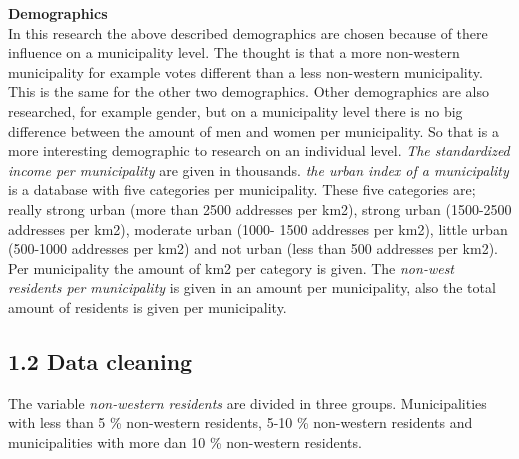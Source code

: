 \documentclass[11pt,]{article}
\begin{document}
\textbf{Demographics}\\
In this research the above described demographics are chosen because of
there influence on a municipality level. The thought is that a more
non-western municipality for example votes different than a less
non-western municipality. This is the same for the other two
demographics. Other demographics are also researched, for example
gender, but on a municipality level there is no big difference between
the amount of men and women per municipality. So that is a more
interesting demographic to research on an individual level. \emph{The
standardized income per municipality} are given in thousands. \emph{the
urban index of a municipality} is a database with five categories per
municipality. These five categories are; really strong urban (more than
2500 addresses per km2), strong urban (1500-2500 addresses per km2),
moderate urban (1000- 1500 addresses per km2), little urban (500-1000
addresses per km2) and not urban (less than 500 addresses per km2). Per
municipality the amount of km2 per category is given. The \emph{non-west
residents per municipality} is given in an amount per municipality, also
the total amount of residents is given per municipality.

\subsection{1.2 Data cleaning}\label{data-cleaning}

The variable \emph{non-western residents} are divided in three groups.
Municipalities with less than 5 \% non-western residents, 5-10 \%
non-western residents and municipalities with more dan 10 \% non-western
residents.
\end{document}
